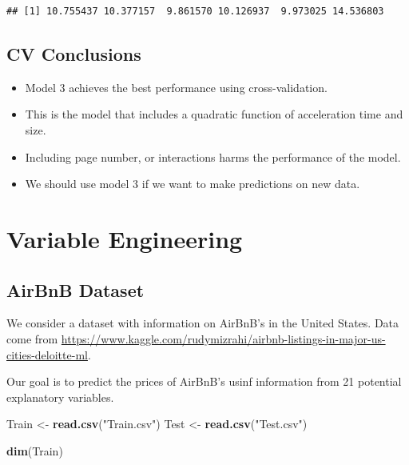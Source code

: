 \documentclass[]{book}
\newenvironment{Shaded}{\begin{snugshade}}{\end{snugshade}}
\newcommand{\KeywordTok}[1]{\textcolor[rgb]{0.13,0.29,0.53}{\textbf{#1}}}
\newcommand{\StringTok}[1]{\textcolor[rgb]{0.31,0.60,0.02}{#1}}
\newcommand{\NormalTok}[1]{#1}
\begin{document}
\begin{verbatim}
## [1] 10.755437 10.377157  9.861570 10.126937  9.973025 14.536803
\end{verbatim}

\subsection{CV Conclusions}\label{cv-conclusions}

\begin{itemize}
\item
  Model 3 achieves the best performance using cross-validation.
\item
  This is the model that includes a quadratic function of acceleration
  time and size.
\item
  Including page number, or interactions harms the performance of the
  model.
\item
  We should use model 3 if we want to make predictions on new data.
\end{itemize}

\section{Variable Engineering}\label{variable-engineering}

\subsection{AirBnB Dataset}\label{airbnb-dataset}

We consider a dataset with information on AirBnB's in the United States.
Data come from
\url{https://www.kaggle.com/rudymizrahi/airbnb-listings-in-major-us-cities-deloitte-ml}.

Our goal is to predict the prices of AirBnB's usinf information from 21
potential explanatory variables.

\begin{Shaded}
\begin{Highlighting}[]
\NormalTok{Train <-}\StringTok{ }\KeywordTok{read.csv}\NormalTok{(}\StringTok{"Train.csv"}\NormalTok{)}
\NormalTok{Test <-}\StringTok{ }\KeywordTok{read.csv}\NormalTok{(}\StringTok{"Test.csv"}\NormalTok{)}
\end{Highlighting}
\end{Shaded}

\begin{Shaded}
\begin{Highlighting}[]
\KeywordTok{dim}\NormalTok{(Train)}
\end{Highlighting}
\end{Shaded}
\end{document}

